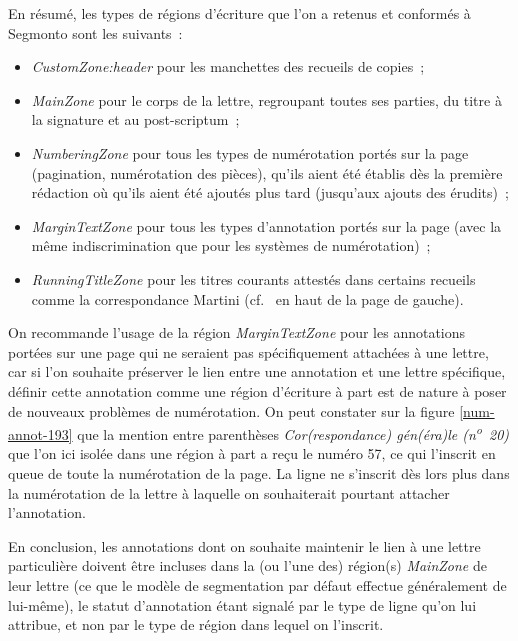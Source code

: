 \documentclass[a4paper,12pt,twoside]{book}
\begin{document}
				En résumé, les types de régions d'écriture que l'on a retenus et conformés à \gls{Segmonto} sont les suivants~:
				
				\begin{itemize}
					\item \textit{CustomZone:header} pour les manchettes des recueils de copies~;
					\item \textit{MainZone} pour le corps de la lettre, regroupant toutes ses parties, du titre à la signature et au post-scriptum~;
					\item \textit{NumberingZone} pour tous les types de numérotation portés sur la page (pagination, numérotation des pièces), qu'ils aient été établis dès la première rédaction où qu'ils aient été ajoutés plus tard (jusqu'aux ajouts des érudits)~;
					\item \textit{MarginTextZone} pour tous les types d'annotation portés sur la page (avec la même indiscrimination que pour les systèmes de numérotation)~;
					\item \textit{RunningTitleZone} pour les titres courants attestés dans certains recueils comme la correspondance Martini (cf.~\cite{CdS19054056} en haut de la page de gauche).
				\end{itemize}
				
				On recommande l'usage de la région \textit{MarginTextZone} pour les annotations portées sur une page qui ne seraient pas spécifiquement attachées à une lettre, car si l'on souhaite préserver le lien entre une annotation et une lettre spécifique, définir cette annotation comme une région d'écriture à part est de nature à poser de nouveaux problèmes de numérotation. On peut constater sur la figure \ref{num-annot-193} que la mention entre parenthèses \textit{Cor(respondance) gén(éra)le (n\textsuperscript{o}~20)} que l'on ici isolée dans une région à part a reçu le numéro 57, ce qui l'inscrit en queue de toute la numérotation de la page. La ligne ne s'inscrit dès lors plus dans la numérotation de la lettre à laquelle on souhaiterait pourtant attacher l'annotation.
				
				En conclusion, les annotations dont on souhaite maintenir le lien à une lettre particulière doivent être incluses dans la (ou l'une des) région(s) \textit{MainZone} de leur lettre (ce que le modèle de segmentation par défaut effectue généralement de lui-même), le statut d'annotation étant signalé par le type de ligne qu'on lui attribue, et non par le type de région dans lequel on l'inscrit.
				
\end{document}

